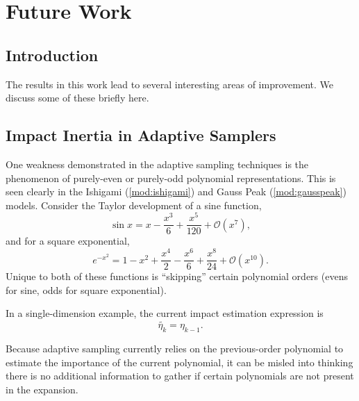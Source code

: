 
\chapter{Future Work} %

\label{ch:future} %



\section{Introduction}
The results in this work lead to several interesting areas of improvement.  We discuss some of these briefly
here.

\section{Impact Inertia in Adaptive Samplers}
One weakness demonstrated in the adaptive sampling techniques is the phenomenon of purely-even or purely-odd
polynomial representations.  This is seen clearly in the Ishigami (\ref{mod:ishigami}) and Gauss Peak
(\ref{mod:gausspeak}) models.  Consider the Taylor development of a sine function,
\begin{equation}\label{eq:sine}
  \sin x = x - \frac{x^3}{6} + \frac{x^5}{120} + \mathcal{O}(x^7),
\end{equation}
and for a square exponential,
\begin{equation}\label{eq:sine}
  e^{-x^2} = 1 - x^2 + \frac{x^4}{2} - \frac{x^6}{6} + \frac{x^8}{24} + \mathcal{O}(x^10).
\end{equation}
Unique to both of these functions is ``skipping'' certain polynomial orders (evens for sine, odds for square
exponential).

In a single-dimension example, the current impact estimation expression is
\begin{equation}
  \tilde{\eta_k}= \eta_{k-1}.
\end{equation}

Because adaptive sampling currently relies on the previous-order polynomial to estimate the
importance of the current polynomial, it can be misled into thinking there is no additional information to
gather if certain polynomials are not present in the expansion.

